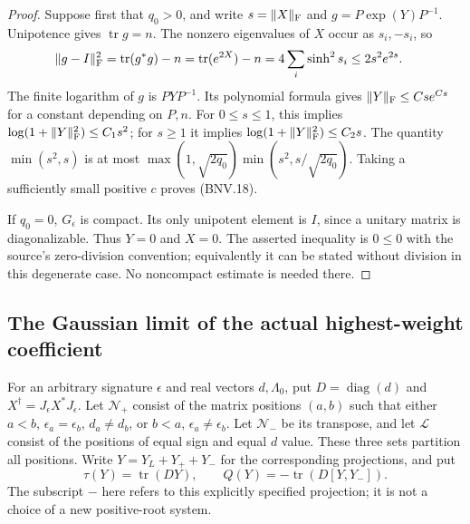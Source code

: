 \documentclass[11pt,a4paper]{article}
\numberwithin{equation}{section}
\theoremstyle{remark}\newtheorem{remark}[theorem]{Remark}
\begin{document}
\begin{proof}
Suppose first that $q_0>0$, and write $s=\|X\|_{\rm F}$ and
$g=P\exp(Y)P^{-1}$.  Unipotence gives $\operatorname{tr}g=n$.
The nonzero eigenvalues of $X$ occur as $s_i,-s_i$, so
\[
 \begin{split}
 \|g-I\|_{\rm F}^2
 &=\operatorname{tr}(g^*g)-n
   =\operatorname{tr}(e^{2X})-n
   =4\sum_i\sinh^2s_i
 \le2s^2e^{2s}.
 \end{split}
\]
The finite logarithm of $g$ is $PYP^{-1}$.  Its polynomial formula gives
$\|Y\|_{\rm F}\le C s e^{Cs}$ for a constant depending on $P,n$.
For $0\le s\le1$, this implies
$\log(1+\|Y\|_{\rm F}^2)\le C_1s^2$; for $s\ge1$ it implies
$\log(1+\|Y\|_{\rm F}^2)\le C_2s$.
The quantity $\min(s^2,s)$ is at most
$\max(1,\sqrt{2q_0})\min(s^2,s/\sqrt{2q_0})$.
Taking a sufficiently small positive $c$ proves (BNV.18).

If $q_0=0$, $G_\epsilon$ is compact.  Its only unipotent element is $I$,
since a unitary matrix is diagonalizable.  Thus $Y=0$ and $X=0$.
The asserted inequality is $0\le0$ with the source's zero-division
convention; equivalently it can be stated without division in this
degenerate case.  No noncompact estimate is needed there.
\end{proof}

\subsection{The Gaussian limit of the actual highest-weight coefficient}

For an arbitrary signature $\epsilon$ and real vectors $d,\Lambda_0$, put
$D=\operatorname{diag}(d)$ and $X^\dagger=J_\epsilon X^*J_\epsilon$.
Let $\mathcal N_+$ consist of the matrix positions $(a,b)$ such that either
$a<b$, $\epsilon_a=\epsilon_b$, $d_a\ne d_b$, or
$b<a$, $\epsilon_a\ne\epsilon_b$.
Let $\mathcal N_-$ be its transpose, and let $\mathcal L$ consist of the
positions of equal sign and equal $d$ value.  These three sets partition
all positions.  Write $Y=Y_L+Y_++Y_-$ for the corresponding projections,
and put
\[
 \tau(Y)=\operatorname{tr}(DY),\qquad
 Q(Y)=-\operatorname{tr}(D[Y,Y_-]).
 \tag{BNV.19}
\]
The subscript $-$ here refers to this explicitly specified projection;
it is not a choice of a new positive-root system.

\end{document}

